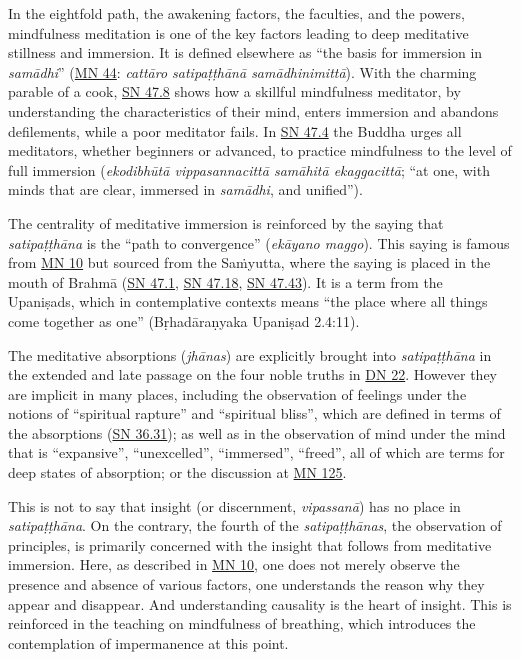 \documentclass[12pt,openany]{book}%
\begin{document}
In the eightfold path, the awakening factors, the faculties, and the powers, mindfulness meditation is one of the key factors leading to deep meditative stillness and immersion. It is defined elsewhere as “the basis for immersion in \textit{\textsanskrit{samādhi}}” (\href{https://suttacentral.net/mn44}{MN 44}: \textit{\textsanskrit{cattāro} \textsanskrit{satipaṭṭhānā} \textsanskrit{samādhinimittā}}). With the charming parable of a cook, \href{https://suttacentral.net/sn47.8}{SN 47.8} shows how a skillful mindfulness meditator, by understanding the characteristics of their mind, enters immersion and abandons defilements, while a poor meditator fails. In \href{https://suttacentral.net/sn47.4}{SN 47.4} the Buddha urges all meditators, whether beginners or advanced, to practice mindfulness to the level of full immersion (\textit{\textsanskrit{ekodibhūtā} \textsanskrit{vippasannacittā} \textsanskrit{samāhitā} \textsanskrit{ekaggacittā}}; “at one, with minds that are clear, immersed in \textit{\textsanskrit{samādhi}}, and unified”).

The centrality of meditative immersion is reinforced by the saying that \textit{\textsanskrit{satipaṭṭhāna}} is the “path to convergence” (\textit{\textsanskrit{ekāyano} maggo}). This saying is famous from \href{https://suttacentral.net/mn10}{MN 10} but sourced from the \textsanskrit{Saṁyutta}, where the saying is placed in the mouth of \textsanskrit{Brahmā} (\href{https://suttacentral.net/sn47.1}{SN 47.1}, \href{https://suttacentral.net/sn47.18}{SN 47.18}, \href{https://suttacentral.net/sn47.43}{SN 47.43}). It is a term from the \textsanskrit{Upaniṣads}, which in contemplative contexts means “the place where all things come together as one” (\textsanskrit{Bṛhadāraṇyaka} \textsanskrit{Upaniṣad} 2.4:11).

The meditative absorptions (\textit{\textsanskrit{jhānas}}) are explicitly brought into \textit{\textsanskrit{satipaṭṭhāna}} in the extended and late passage on the four noble truths in \href{https://suttacentral.net/dn22}{DN 22}. However they are implicit in many places, including the observation of feelings under the notions of “spiritual rapture” and “spiritual bliss”, which are defined in terms of the absorptions (\href{https://suttacentral.net/sn36.31}{SN 36.31}); as well as in the observation of mind under the mind that is “expansive”, “unexcelled”, “immersed”, “freed”, all of which are terms for deep states of absorption; or the discussion at \href{https://suttacentral.net/mn125}{MN 125}.

This is not to say that insight (or discernment, \textit{\textsanskrit{vipassanā}}) has no place in \textit{\textsanskrit{satipaṭṭhāna}}. On the contrary, the fourth of the \textit{\textsanskrit{satipaṭṭhānas}}, the observation of principles, is primarily concerned with the insight that follows from meditative immersion. Here, as described in \href{https://suttacentral.net/mn10}{MN 10}, one does not merely observe the presence and absence of various factors, one understands the reason why they appear and disappear. And understanding causality is the heart of insight. This is reinforced in the teaching on mindfulness of breathing, which introduces the contemplation of impermanence at this point.
\end{document}
